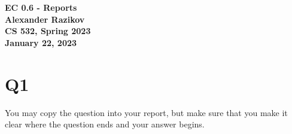 \documentclass{article}
\begin{document}
\thispagestyle{plain}
    \begin{center}
        \Large
        \textbf{EC 0.6 - Reports}
        \\
        \vspace{0.4cm}
        \large
        \textbf{Alexander Razikov}
         \\
        \vspace{0.4cm}
        \large
        \textbf{CS 532, Spring 2023 }
         \\
        \vspace{0.4cm}
        \large
        \textbf{January 22, 2023}
    \end{center}
    
	\section*{Q1}
	You may copy the question into your report, but make sure that you make it clear where the question ends and your answer begins.

\end{document}
